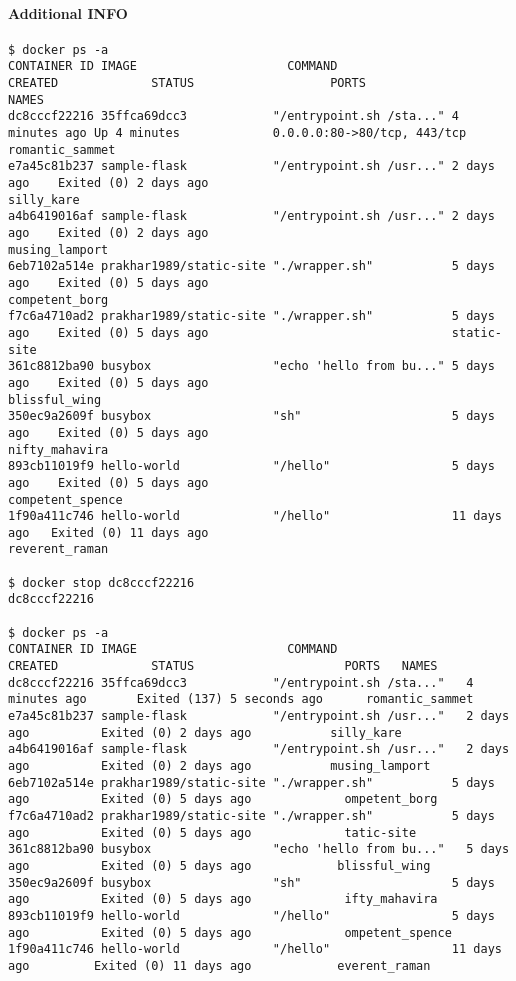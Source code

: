 \paragraph{Additional INFO}


\begin{lstlisting}[basicstyle=\tiny]
$ docker ps -a
CONTAINER ID IMAGE                     COMMAND                  CREATED             STATUS                   PORTS                         NAMES
dc8cccf22216 35ffca69dcc3            "/entrypoint.sh /sta..." 4 minutes ago Up 4 minutes             0.0.0.0:80->80/tcp, 443/tcp   romantic_sammet
e7a45c81b237 sample-flask            "/entrypoint.sh /usr..." 2 days ago    Exited (0) 2 days ago                                  silly_kare
a4b6419016af sample-flask            "/entrypoint.sh /usr..." 2 days ago    Exited (0) 2 days ago                                  musing_lamport
6eb7102a514e prakhar1989/static-site "./wrapper.sh"           5 days ago    Exited (0) 5 days ago                                  competent_borg
f7c6a4710ad2 prakhar1989/static-site "./wrapper.sh"           5 days ago    Exited (0) 5 days ago                                  static-site
361c8812ba90 busybox                 "echo 'hello from bu..." 5 days ago    Exited (0) 5 days ago                                  blissful_wing
350ec9a2609f busybox                 "sh"                     5 days ago    Exited (0) 5 days ago                                  nifty_mahavira
893cb11019f9 hello-world             "/hello"                 5 days ago    Exited (0) 5 days ago                                  competent_spence
1f90a411c746 hello-world             "/hello"                 11 days ago   Exited (0) 11 days ago                                 reverent_raman

$ docker stop dc8cccf22216
dc8cccf22216

$ docker ps -a
CONTAINER ID IMAGE                     COMMAND                  CREATED             STATUS                     PORTS   NAMES
dc8cccf22216 35ffca69dcc3            "/entrypoint.sh /sta..."   4 minutes ago       Exited (137) 5 seconds ago      romantic_sammet
e7a45c81b237 sample-flask            "/entrypoint.sh /usr..."   2 days ago          Exited (0) 2 days ago           silly_kare
a4b6419016af sample-flask            "/entrypoint.sh /usr..."   2 days ago          Exited (0) 2 days ago           musing_lamport
6eb7102a514e prakhar1989/static-site "./wrapper.sh"           5 days ago          Exited (0) 5 days ago             ompetent_borg
f7c6a4710ad2 prakhar1989/static-site "./wrapper.sh"           5 days ago          Exited (0) 5 days ago             tatic-site
361c8812ba90 busybox                 "echo 'hello from bu..."   5 days ago          Exited (0) 5 days ago            blissful_wing
350ec9a2609f busybox                 "sh"                     5 days ago          Exited (0) 5 days ago             ifty_mahavira
893cb11019f9 hello-world             "/hello"                 5 days ago          Exited (0) 5 days ago             ompetent_spence
1f90a411c746 hello-world             "/hello"                 11 days ago         Exited (0) 11 days ago            everent_raman
\end{lstlisting}


